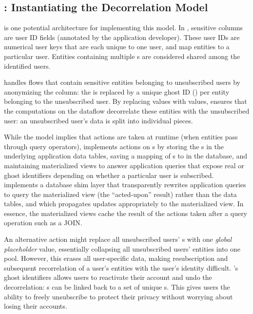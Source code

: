 \subsection{\sys{}: Instantiating the Decorrelation Model}
\sys{} is one potential architecture for implementing this model. In \sys{}, sensitive columns are
user ID fields (annotated by the application developer).  These user IDs are
numerical user keys \uidkey{} that are each unique to one user, and map entities to a particular
user. Entities containing multiple \uidkey{}s are considered shared among the identified users. 

\sys{} handles flows that contain sensitive entities belonging to unsubscribed users by anonymizing
the \uidkey{} column: the \uidkey{} is replaced by a unique ghost ID
(\gidkey{}) per entity belonging to the unsubscribed user. 
By replacing \uidkey{} values with \gidkey{} values, \sys{} ensures that the
computations on the dataflow decorrelate these entities with the unsubscribed user: an unsubscribed
user's data is split into individual pieces. 

While the model implies that actions are taken at runtime (when entities pass through query
operators), \sys{} implements actions on \uidkey{}s by storing the \gidkey{}s in the underlying
application data tables, saving a mapping of \gidkey{}s to \uidkey{} in the database, and
maintaining materialized views to answer application queries that expose real or ghost identifiers
depending on whether a particular user is subscribed. \sys{} implements a database shim layer that
transparently rewrites application queries to query the materialized view (the ``acted-upon''
result) rather than the data tables, and which propagates updates appropriately to the materialized
view. In essence, the materialized views cache the result of the actions taken after a query
operation such as a JOIN.

An alternative action might replace all unsubscribed users' \uidkey{}s with one \emph{global
placeholder} value, essentially collapsing all unsubscribed users' entities into one pool. However,
this erases all user-specific data, making resubscription and subsequent recorrelation of a user's
entities with the user's identity difficult. \sys{}'s ghost identifiers allows users to reactivate
their account and undo the decorrelation: \uidkey{}s can be linked back to a set of unique
\gidkey{}s.  This gives users the ability to freely unsubscribe to protect their privacy without
worrying about losing their accounts.  

